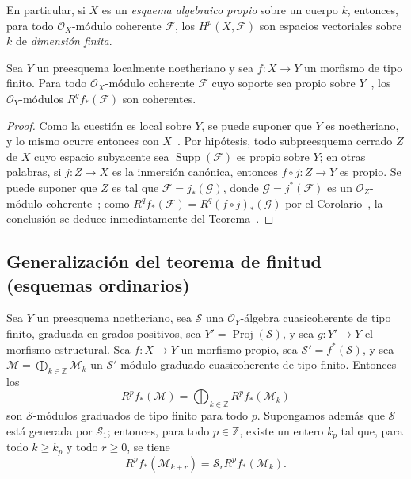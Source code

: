 En particular, si $X$ es un \emph{esquema algebraico propio} sobre un cuerpo $k$, entonces, para todo $\mathcal O_X$-módulo coherente $\mathcal F$, los $H^p(X,\mathcal F)$ son espacios vectoriales sobre $k$ de \emph{dimensión finita}.

\begin{corollary}[3.2.4]
\label{III.3.2.4}
\label{III.3.2.4-fr}
Sea $Y$ un preesquema localmente noetheriano y sea $f:X\to Y$ un morfismo de tipo finito.
Para todo $\mathcal O_X$-módulo coherente $\mathcal F$ cuyo soporte sea propio sobre $Y$~, los $\mathcal O_Y$-módulos $R^qf_*(\mathcal F)$ son coherentes.
\end{corollary}

\begin{proof}
Como la cuestión es local sobre $Y$, se puede suponer que $Y$ es noetheriano, y lo mismo ocurre entonces con $X$~.
Por hipótesis, todo subpreesquema cerrado $Z$ de $X$ cuyo espacio subyacente sea $\operatorname{Supp}(\mathcal F)$ es propio sobre $Y$; en otras palabras, si $j:Z\to X$ es la inmersión canónica, entonces $f\circ j:Z\to Y$ es propio.
Se puede suponer que $Z$ es tal que $\mathcal F=j_*(\mathcal G)$, donde $\mathcal G=j^*(\mathcal F)$ es un $\mathcal O_Z$-módulo coherente~; como $R^qf_*(\mathcal F)=R^q(f\circ j)_*(\mathcal G)$ por el Corolario~, la conclusión se deduce inmediatamente del Teorema~.
\end{proof}

\subsection{Generalización del teorema de finitud (esquemas ordinarios)}
\label{subsection:III.3.3}
\label{subsection:III.3.3-fr}

\begin{proposition}[3.3.1]
\label{III.3.3.1}
\label{III.3.3.1-fr}
Sea $Y$ un preesquema noetheriano, sea $\mathcal S$ una $\mathcal O_Y$-álgebra cuasicoherente de tipo finito, graduada en grados positivos, sea $Y'=\operatorname{Proj}(\mathcal S)$, y sea $g:Y'\to Y$ el morfismo estructural.
Sea $f:X\to Y$ un morfismo propio, sea $\mathcal S'=f^*(\mathcal S)$, y sea $\mathcal M=\bigoplus_{k\in\mathbb Z}\mathcal M_k$ un $\mathcal S'$-módulo graduado cuasicoherente de tipo finito.
Entonces los \[
R^pf_*(\mathcal M)=\bigoplus_{k\in\mathbb Z}R^pf_*(\mathcal M_k)
\] son $\mathcal S$-módulos graduados de tipo finito para todo $p$.
Supongamos además que $\mathcal S$ está generada por $\mathcal S_1$; entonces, para todo $p\in\mathbb Z$, existe un entero $k_p$ tal que, para todo $k\geq k_p$ y todo $r\geq0$, se tiene
\[
R^pf_*(\mathcal M_{k+r})=\mathcal S_rR^pf_*(\mathcal M_k).
\tag{3.3.1.1}\label{III.3.3.1.1-fr}
\] 
\end{proposition}


